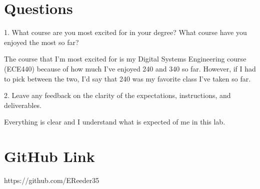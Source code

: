 \documentclass[12pt]{article}
\begin{document}
\section{Questions}

1. What course are you most excited for in your degree? What course have you enjoyed the most so far?

The course that I'm most excited for is my Digital Systems Engineering course (ECE440) because of how much I've enjoyed 240 and 340 so far. However, if I had to pick between the two, I'd say that 240 was my favorite class I've taken so far.

2. Leave any feedback on the clarity of the expectations, instructions, and deliverables.

Everything is clear and I understand what is expected of me in this lab.

\section{GitHub Link}

https://github.com/EReeder35
\end{document}
